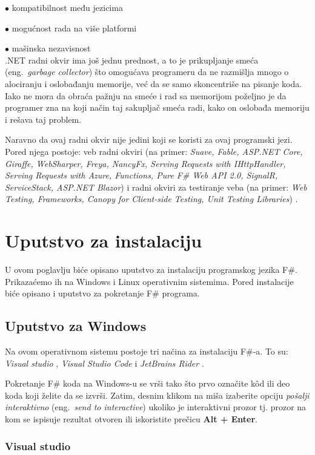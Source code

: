 \documentclass[a4paper]{article}
\begin{document}
	$\bullet$ kompatibilnost među jezicima
	
	$\bullet$ mogućnost rada na više platformi
	
	$\bullet$ mašinska nezavisnost
\\

.NET radni okvir ima još jednu prednost, a to je prikupljanje smeća (eng.~{\em garbage collector}) što omogućava programeru da ne razmišlja mnogo o alociranju i oslobađanju memorije, već da se samo skoncentriše na pisanje koda. Iako ne mora da obraća pažnju na smeće i rad sa memorijom poželjno je da programer zna na koji način taj sakupljač smeća radi, kako on oslobađa memoriju i rešava taj problem.

Naravno da ovaj radni okvir nije jedini koji se koristi za ovaj programski jezi. Pored njega postoje: veb radni okviri (na primer: {\em Suave, Fable, ASP.NET Core, Giraffe, WebSharper, Freya, NancyFx, Serving Requests with IHttpHandler, Serving Requests with Azure, Functions, Pure F\# Web API 2.0, SignalR, ServiceStack, ASP.NET Blazor}) i radni okviri za testiranje veba (na primer: {\em Web Testing, Frameworks, Canopy for Client-side Testing, Unit Testing Libraries}) \cite{fwFs}.

\section{Uputstvo za instalaciju}

U ovom poglavlju biće opisano uputstvo za instalaciju programskog jezika F\#. Prikazaćemo ih na Windows i Linux operativnim sistemima. Pored instalacije biće opisano i uputstvo za pokretanje F\# programa.

\subsection{Uputstvo za Windows}

Na ovom operativnom sistemu postoje tri načina za instalaciju F\#-a. To su: {\em Visual studio} \cite{vStud}, {\em Visual Studio Code} \cite{vStudCode} i {\em JetBrains Rider} \cite{jetBrains}.

Pokretanje F\# koda na Windows-u se vrši tako što prvo označite kôd ili deo koda koji želite da se izvrši. Zatim, desnim klikom na miša izaberite opciju {\em pošalji interaktivno} (eng.~{\em send to interactive}) ukoliko je interaktivni prozor tj. prozor na kom se ispisuje rezultat otvoren ili iskoristite prečicu \textbf{Alt + Enter}.

\subsubsection{Visual studio}
	
\end{document}
